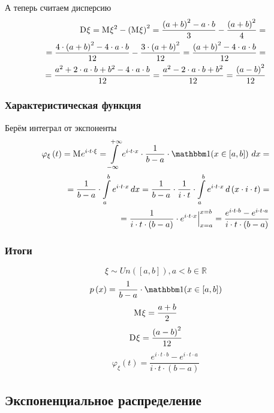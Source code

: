 А теперь считаем дисперсию
\begin{align*}
    \mathrm{D}_{} \xi
        = \mathrm{M}_{} \xi^2 - \left( \mathrm{M}_{} \xi \right)^2
        = \frac{\left( a + b \right)^2 - a \cdot b}{3}
            - \frac{\left( a + b \right)^2}{4} = \\
        = \frac{4 \cdot \left( a + b \right)^2 - 4 \cdot a \cdot b}{12}
            - \frac{3 \cdot \left( a + b \right)^2}{12}
        = \frac{\left( a + b \right)^2 - 4 \cdot a \cdot b}{12} = \\
        = \frac{a^2 + 2 \cdot a \cdot b + b^2 - 4 \cdot a \cdot b}{12}
        = \frac{a^2 - 2 \cdot a \cdot b + b^2}{12}
        = \frac{\left( a-b \right)^2}{12}
\end{align*}
\subsubsection{Характеристическая функция}
Берём интеграл от экспоненты
\begin{align*}
    \varphi_{\xi}\left( t \right) = \mean{e^{i \cdot t \cdot \xi}}
        = \integral{-\infty}{+\infty}{x}{
            e^{i \cdot t \cdot x} \cdot \frac{1}{b-a}
                \cdot \indicator{x \in [a,b]}} = \\
        = \frac{1}{b-a} \cdot \integral{a}{b}{x}{e^{i \cdot t \cdot x}}
        = \frac{1}{b-a} \cdot \frac{1}{i \cdot t}
            \cdot \integral{a}{b}{\left( x \cdot i \cdot t \right)}
                {e^{i \cdot t \cdot x}} = \\
        = \frac{1}{i \cdot t \cdot \left( b - a \right)}
            \cdot \Bigl. e^{i \cdot t \cdot x} \Bigr|_{x=a}^{x=b}
        = \frac{e^{i \cdot t \cdot b} - e^{i \cdot t \cdot a}}
            {i \cdot t \cdot \left( b - a \right)}
\end{align*}
\subsubsection{Итоги}
$$\xi \sim Un\left( \left[ a,b \right] \right), a<b \in \mathbb{R}$$
$$\pdf{x}
    = \frac{1}{b-a} \cdot \indicator{x \in [a,b]}$$
$$\mathrm{M}_{} \xi = \frac{a+b}{2}$$
$$\mathrm{D}_{} \xi = \frac{\left( a-b \right)^2}{12}$$
$$\varphi_{\xi}\left( t \right) =
    \frac{e^{i \cdot t \cdot b} - e^{i \cdot t \cdot a}}
        {i \cdot t \cdot \left( b - a \right)}$$

\subsection{Экспоненциальное распределение}
